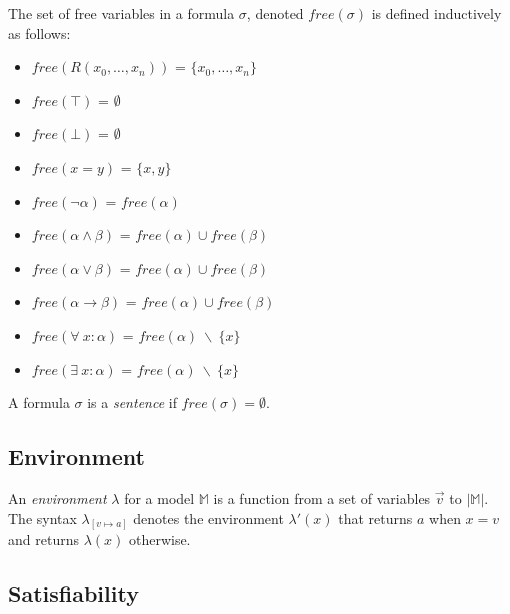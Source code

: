 		The set of free variables in a formula $\sigma$, denoted $free(\sigma)$
		is defined inductively as follows:
		\begin{itemize}
		\item $free( R(x_0,\ldots,x_n) )$ = $\{x_0,\ldots,x_n\}$
		\item $free(\top)$ = $\emptyset$
		\item $free(\bot)$ = $\emptyset$
		\item $free(x = y)$ = $\{x,y\}$
		\item $free(\neg\alpha)$ = $free(\alpha)$
		\item $free(\alpha \wedge \beta)$ = $free(\alpha) \cup free(\beta)$
		\item $free(\alpha \vee   \beta)$ = $free(\alpha) \cup free(\beta)$
		\item $free(\alpha \to    \beta)$ = $free(\alpha) \cup free(\beta)$
		\item $free(\forall\ x : \alpha)$ = $free(\alpha)\ \backslash\ \{x\}$
		\item $free(\exists\ x : \alpha)$ = $free(\alpha)\ \backslash\ \{x\}$
		\end{itemize}
		A formula $\sigma$ is a \emph{sentence} if $free(\sigma) = \emptyset$.

	\subsection{Environment}

		An \emph{environment} $\lambda$ for a model $\mathbb{M}$ is a function
		from a set of variables $\vec v$ to $|\mathbb{M}|$. The syntax
		$\lambda_{[v \mapsto a]}$ denotes the environment $\lambda'(x)$ that
		returns $a$ when $x=v$ and returns $\lambda(x)$ otherwise.

	\subsection{Satisfiability}

